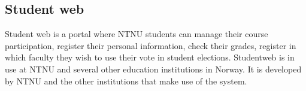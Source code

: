 \subsection{Student web}

Student web is a portal where NTNU students can manage their course participation, register their personal information, check their grades, register in which faculty they wish to use their vote in student elections.
Studentweb is in use at NTNU and several other education institutions in Norway. It is developed by NTNU and the other institutions that make use of the system.